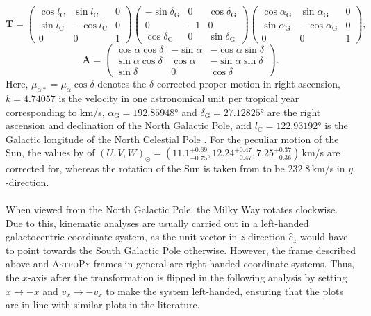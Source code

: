 \documentclass[a4paper,11pt]{article}
\begin{document}
\begin{equation}
 \bm{T} =
 \begin{pmatrix}
  \cos{l_\mathrm{C}} & \sin{l_\mathrm{C}} & 0 \\
  \sin{l_\mathrm{C}} & -\cos{l_\mathrm{C}} & 0 \\
  0 & 0 & 1
 \end{pmatrix}
 \begin{pmatrix}
  -\sin{\delta_\mathrm{G}} & 0 & \cos{\delta_\mathrm{G}} \\
  0 & -1 & 0 \\
  \cos{\delta_\mathrm{G}} & 0 & \sin{\delta_\mathrm{G}}
 \end{pmatrix} 
 \begin{pmatrix}
  \cos{\alpha_\mathrm{G}} & \sin{\alpha_\mathrm{G}} & 0 \\
  \sin{\alpha_\mathrm{G}} & -\cos{\alpha_\mathrm{G}} & 0 \\
  0 & 0 & 1
 \end{pmatrix},
\end{equation}
\begin{equation}
 \bm{A} =
 \begin{pmatrix}
  \cos{\alpha}\cos{\delta} & -\sin{\alpha} & -\cos{\alpha}\sin{\delta} \\
  \sin{\alpha}\cos{\delta} & \cos{\alpha} & -\sin{\alpha}\sin{\delta} \\
  \sin{\delta} & 0 & \cos{\delta}
 \end{pmatrix}.
\end{equation}
%
Here, $\mu_{\alpha *}=\mu_\alpha\cos{\delta}$ denotes the $\delta$-corrected proper motion in right ascension, $k=4.74057$ is the velocity in one astronomical unit per tropical year corresponding to km/s, $\alpha_\mathrm{G}=192.85948$° and $\delta_\mathrm{G}=27.12825$° are the right ascension and declination of the North Galactic Pole, and $l_\mathrm{C}=122.93192$° is the Galactic longitude of the North Celestial Pole \citep{perryman97}. For the peculiar motion of the Sun, the values by \citet{schonrich10} of $(U,V,W)_\odot=(11.1^{+0.69}_{-0.75},12.24^{+0.47}_{-0.47},7.25^{+0.37}_{-0.36})$\,km/s are corrected for, whereas the rotation of the Sun is taken from \citet{mcmillan17} to be $232.8$\,km/s in $y$-direction.\\ \\
%
When viewed from the North Galactic Pole, the Milky Way rotates clockwise. Due to this, kinematic analyses are usually carried out in a left-handed galactocentric coordinate system, as the unit vector in $z$-direction $\hat{e}_z$ would have to point towards the South Galactic Pole otherwise. However, the frame described above and \textsc{AstroPy} frames in general are right-handed coordinate systems. Thus, the $x$-axis after the transformation is flipped in the following analysis by setting $x\rightarrow-x$ and $v_x\rightarrow-v_x$ to make the system left-handed, ensuring that the plots are in line with similar plots in the literature.\\ \\
\end{document}
